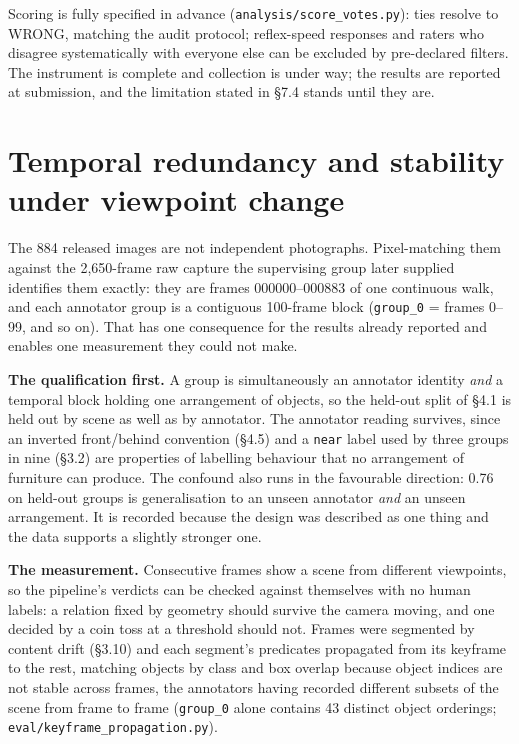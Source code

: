Scoring is fully specified in advance (\texttt{analysis/score\_votes.py}): ties resolve to WRONG, matching the audit protocol; reflex-speed responses and raters who disagree systematically with everyone else can be excluded by pre-declared filters. The instrument is complete and collection is under way; the results are reported at submission, and the limitation stated in \S7.4 stands until they are.

\section{Temporal redundancy and stability under viewpoint change}

The 884 released images are not independent photographs. Pixel-matching them against the 2,650-frame raw capture the supervising group later supplied identifies them exactly: they are frames 000000--000883 of one continuous walk, and each annotator group is a contiguous 100-frame block (\texttt{group\_0} = frames 0--99, and so on). That has one consequence for the results already reported and enables one measurement they could not make.

\textbf{The qualification first.} A group is simultaneously an annotator identity \textit{and} a temporal block holding one arrangement of objects, so the held-out split of \S4.1 is held out by scene as well as by annotator. The annotator reading survives, since an inverted front/behind convention (\S4.5) and a \texttt{near} label used by three groups in nine (\S3.2) are properties of labelling behaviour that no arrangement of furniture can produce. The confound also runs in the favourable direction: 0.76 on held-out groups is generalisation to an unseen annotator \textit{and} an unseen arrangement. It is recorded because the design was described as one thing and the data supports a slightly stronger one.

\textbf{The measurement.} Consecutive frames show a scene from different viewpoints, so the pipeline's verdicts can be checked against themselves with no human labels: a relation fixed by geometry should survive the camera moving, and one decided by a coin toss at a threshold should not. Frames were segmented by content drift (\S3.10) and each segment's predicates propagated from its keyframe to the rest, matching objects by class and box overlap because object indices are not stable across frames, the annotators having recorded different subsets of the scene from frame to frame (\texttt{group\_0} alone contains 43 distinct object orderings; \texttt{eval/keyframe\_propagation.py}).

